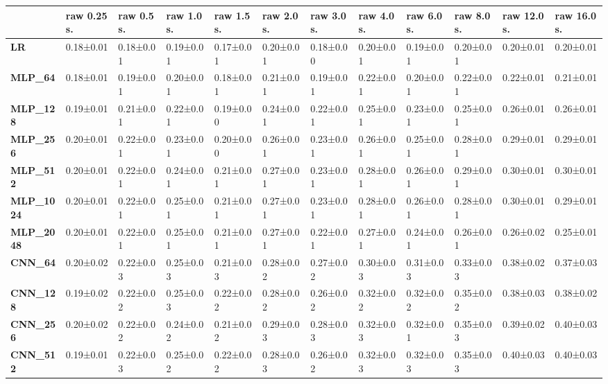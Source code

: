 \begin{tabular}{llllllllllll}
\toprule
{} & raw 0.25 s. & raw 0.5 s. & raw 1.0 s. & raw 1.5 s. & raw 2.0 s. & raw 3.0 s. & raw 4.0 s. & raw 6.0 s. & raw 8.0 s. & raw 12.0 s. & raw 16.0 s. \\
\midrule
\textbf{LR            } &   0.18±0.01 &  0.18±0.01 &  0.19±0.01 &  0.17±0.01 &  0.20±0.01 &  0.18±0.00 &  0.20±0.01 &  0.19±0.01 &  0.20±0.01 &   0.20±0.01 &   0.20±0.01 \\
\textbf{MLP\_64        } &   0.18±0.01 &  0.19±0.01 &  0.20±0.01 &  0.18±0.01 &  0.21±0.01 &  0.19±0.01 &  0.22±0.01 &  0.20±0.01 &  0.22±0.01 &   0.22±0.01 &   0.21±0.01 \\
\textbf{MLP\_128       } &   0.19±0.01 &  0.21±0.01 &  0.22±0.01 &  0.19±0.00 &  0.24±0.01 &  0.22±0.01 &  0.25±0.01 &  0.23±0.01 &  0.25±0.01 &   0.26±0.01 &   0.26±0.01 \\
\textbf{MLP\_256       } &   0.20±0.01 &  0.22±0.01 &  0.23±0.01 &  0.20±0.00 &  0.26±0.01 &  0.23±0.01 &  0.26±0.01 &  0.25±0.01 &  0.28±0.01 &   0.29±0.01 &   0.29±0.01 \\
\textbf{MLP\_512       } &   0.20±0.01 &  0.22±0.01 &  0.24±0.01 &  0.21±0.01 &  0.27±0.01 &  0.23±0.01 &  0.28±0.01 &  0.26±0.01 &  0.29±0.01 &   0.30±0.01 &   0.30±0.01 \\
\textbf{MLP\_1024      } &   0.20±0.01 &  0.22±0.01 &  0.25±0.01 &  0.21±0.01 &  0.27±0.01 &  0.23±0.01 &  0.28±0.01 &  0.26±0.01 &  0.28±0.01 &   0.30±0.01 &   0.29±0.01 \\
\textbf{MLP\_2048      } &   0.20±0.01 &  0.22±0.01 &  0.25±0.01 &  0.21±0.01 &  0.27±0.01 &  0.22±0.01 &  0.27±0.01 &  0.24±0.01 &  0.26±0.01 &   0.26±0.02 &   0.25±0.01 \\
\textbf{CNN\_64        } &   0.20±0.02 &  0.22±0.03 &  0.25±0.03 &  0.21±0.03 &  0.28±0.02 &  0.27±0.02 &  0.30±0.03 &  0.31±0.03 &  0.33±0.03 &   0.38±0.02 &   0.37±0.03 \\
\textbf{CNN\_128       } &   0.19±0.02 &  0.22±0.02 &  0.25±0.03 &  0.22±0.02 &  0.28±0.02 &  0.26±0.02 &  0.32±0.02 &  0.32±0.02 &  0.35±0.02 &   0.38±0.03 &   0.38±0.02 \\
\textbf{CNN\_256       } &   0.20±0.02 &  0.22±0.02 &  0.24±0.02 &  0.21±0.02 &  0.29±0.03 &  0.28±0.03 &  0.32±0.03 &  0.32±0.01 &  0.35±0.03 &   0.39±0.02 &   0.40±0.03 \\
\textbf{CNN\_512       } &   0.19±0.01 &  0.22±0.03 &  0.25±0.02 &  0.22±0.02 &  0.28±0.03 &  0.26±0.02 &  0.32±0.03 &  0.32±0.03 &  0.35±0.03 &   0.40±0.03 &   0.40±0.03 \\

\end{tabular}
